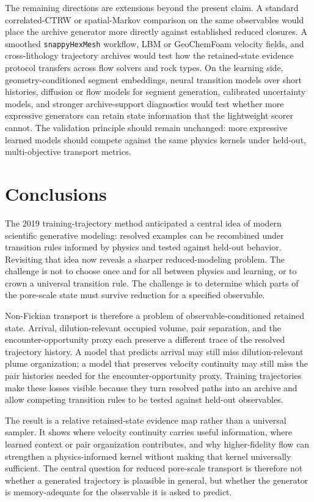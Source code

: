 \documentclass[11pt]{article}
\begin{document}
The remaining directions are extensions beyond the present claim. A standard correlated-CTRW or spatial-Markov comparison on the same observables would place the archive generator more directly against established reduced closures. A smoothed \texttt{snappyHexMesh} workflow, LBM or GeoChemFoam velocity fields, and cross-lithology trajectory archives would test how the retained-state evidence protocol transfers across flow solvers and rock types. On the learning side, geometry-conditioned segment embeddings, neural transition models over short histories, diffusion or flow models for segment generation, calibrated uncertainty models, and stronger archive-support diagnostics would test whether more expressive generators can retain state information that the lightweight scorer cannot. The validation principle should remain unchanged: more expressive learned models should compete against the same physics kernels under held-out, multi-objective transport metrics.

\section{Conclusions}

The 2019 training-trajectory method anticipated a central idea of modern scientific generative modeling: resolved examples can be recombined under transition rules informed by physics and tested against held-out behavior. Revisiting that idea now reveals a sharper reduced-modeling problem. The challenge is not to choose once and for all between physics and learning, or to crown a universal transition rule. The challenge is to determine which parts of the pore-scale state must survive reduction for a specified observable.

Non-Fickian transport is therefore a problem of observable-conditioned retained state. Arrival, dilution-relevant occupied volume, pair separation, and the encounter-opportunity proxy each preserve a different trace of the resolved trajectory history. A model that predicts arrival may still miss dilution-relevant plume organization; a model that preserves velocity continuity may still miss the pair histories needed for the encounter-opportunity proxy. Training trajectories make these losses visible because they turn resolved paths into an archive and allow competing transition rules to be tested against held-out observables.

The result is a relative retained-state evidence map rather than a universal sampler. It shows where velocity continuity carries useful information, where learned context or pair organization contributes, and why higher-fidelity flow can strengthen a physics-informed kernel without making that kernel universally sufficient. The central question for reduced pore-scale transport is therefore not whether a generated trajectory is plausible in general, but whether the generator is memory-adequate for the observable it is asked to predict.
\end{document}
